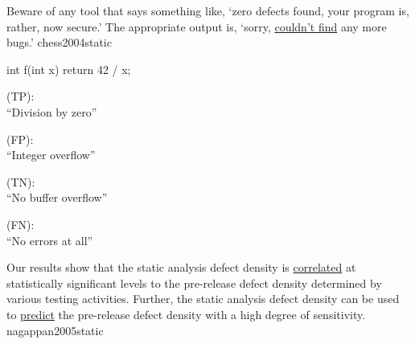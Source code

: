 \documentclass{article}
\begin{document}
  {Beware of any tool that says something like, `zero defects found, your program is, rather, now secure.' The appropriate output is, `sorry, \ul{couldn’t find} any more bugs.'}
  {chess2004static}

\begin{multicols}{2}
{\small\begin{ffcode}
int f(int x) {
  return 42 / x;
}
\end{ffcode}
}
\par\columnbreak\par
\textcolor{green}{} (TP): \\ ``Division by zero''\par
\textcolor{red}{} (FP): \\ ``Integer overflow''\par
\textcolor{green}{} (TN): \\ ``No buffer overflow''\par
\textcolor{red}{} (FN): \\ ``No errors at all''\par
\end{multicols}
\plush{}

  {Our results show that the static analysis defect density is \ul{correlated} at statistically significant levels to the pre-release defect density determined by various testing activities. Further, the static analysis defect density can be used to \ul{predict} the pre-release defect density with a high degree of sensitivity.}
  {nagappan2005static}

\end{document}
